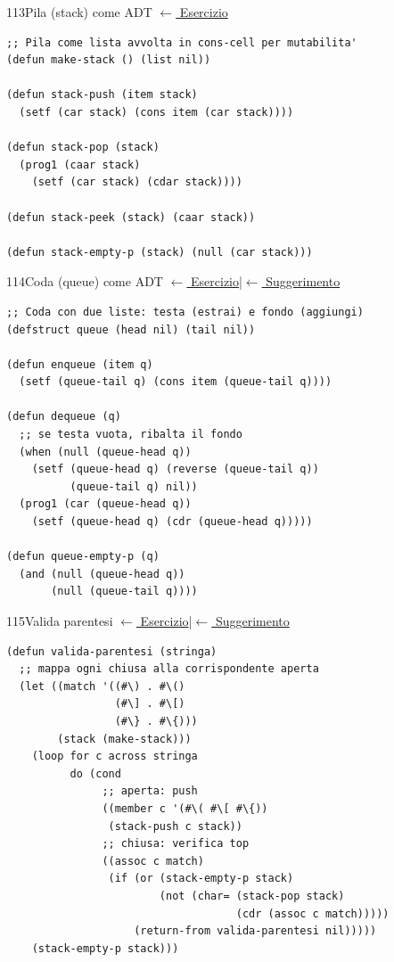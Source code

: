 \label{sol:113}
\begin{solbox}{113}{Pila (stack) come ADT}
\small\color{black!55}\hyperref[ex:113]{$\leftarrow$ Esercizio}\normalsize\color{black}
\begin{lstlisting}
;; Pila come lista avvolta in cons-cell per mutabilita'
(defun make-stack () (list nil))

(defun stack-push (item stack)
  (setf (car stack) (cons item (car stack))))

(defun stack-pop (stack)
  (prog1 (caar stack)
    (setf (car stack) (cdar stack))))

(defun stack-peek (stack) (caar stack))

(defun stack-empty-p (stack) (null (car stack)))
\end{lstlisting}
\end{solbox}

\label{sol:114}
\begin{solbox}{114}{Coda (queue) come ADT}
\small\color{black!55}\hyperref[ex:114]{$\leftarrow$ Esercizio}\enspace\textcolor{black!30}{|}\enspace\hyperref[hint:114]{$\leftarrow$ Suggerimento}\normalsize\color{black}
\begin{lstlisting}
;; Coda con due liste: testa (estrai) e fondo (aggiungi)
(defstruct queue (head nil) (tail nil))

(defun enqueue (item q)
  (setf (queue-tail q) (cons item (queue-tail q))))

(defun dequeue (q)
  ;; se testa vuota, ribalta il fondo
  (when (null (queue-head q))
    (setf (queue-head q) (reverse (queue-tail q))
          (queue-tail q) nil))
  (prog1 (car (queue-head q))
    (setf (queue-head q) (cdr (queue-head q)))))

(defun queue-empty-p (q)
  (and (null (queue-head q))
       (null (queue-tail q))))
\end{lstlisting}
\end{solbox}

\label{sol:115}
\begin{solbox}{115}{Valida parentesi}
\small\color{black!55}\hyperref[ex:115]{$\leftarrow$ Esercizio}\enspace\textcolor{black!30}{|}\enspace\hyperref[hint:115]{$\leftarrow$ Suggerimento}\normalsize\color{black}
\begin{lstlisting}
(defun valida-parentesi (stringa)
  ;; mappa ogni chiusa alla corrispondente aperta
  (let ((match '((#\) . #\()
                 (#\] . #\[)
                 (#\} . #\{)))
        (stack (make-stack)))
    (loop for c across stringa
          do (cond
               ;; aperta: push
               ((member c '(#\( #\[ #\{))
                (stack-push c stack))
               ;; chiusa: verifica top
               ((assoc c match)
                (if (or (stack-empty-p stack)
                        (not (char= (stack-pop stack)
                                    (cdr (assoc c match)))))
                    (return-from valida-parentesi nil)))))
    (stack-empty-p stack)))
\end{lstlisting}
\end{solbox}

